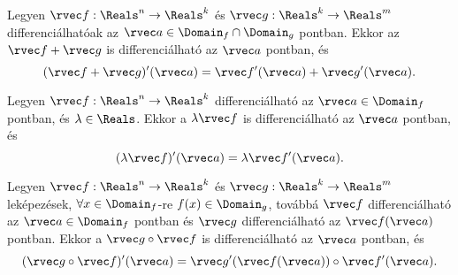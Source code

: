 \begin{statement}
  Legyen $\rvec f: \Reals^n \to \Reals^k$ és $\rvec g: \Reals^k \to \Reals^m$
  differenciálhatóak az $\rvec a \in \Domain_f \cap \Domain_g$ pontban. Ekkor
  az $\rvec f + \rvec g$ is differenciálható az $\rvec a$ pontban, és
  $$
    (\rvec f + \rvec g)'(\rvec a) = \rvec f'(\rvec a) + \rvec g'(\rvec a)
    \text.
  $$
\end{statement}

\begin{statement}
  Legyen $\rvec f: \Reals^n \to \Reals^k$ differenciálható az
  $\rvec a \in \Domain_f$ pontban, és $\lambda \in \Reals$. Ekkor a
  $\lambda \rvec f$ is differenciálható az $\rvec a$ pontban, és
  $$
    (\lambda \rvec f)'(\rvec a) = \lambda \rvec f'(\rvec a)
    \text.
  $$
\end{statement}

\begin{statement}
  Legyen $\rvec f: \Reals^n \to \Reals^k$ és $\rvec g: \Reals^k \to \Reals^m$
  leképezések, $\forall x \in \Domain_f$-re $f(x) \in \Domain_g$, továbbá
  $\rvec f$ differenciálható az $\rvec a \in \Domain_f$ pontban és
  $\rvec g$ differenciálható az $\rvec f(\rvec a)$ pontban. Ekkor a
  $\rvec g \circ \rvec f$ is differenciálható az $\rvec a$ pontban, és
  $$
    (\rvec g \circ \rvec f)'(\rvec a) = \rvec g'(\rvec f(\rvec a)) \circ \rvec f'(\rvec a)
    \text.
  $$
\end{statement}